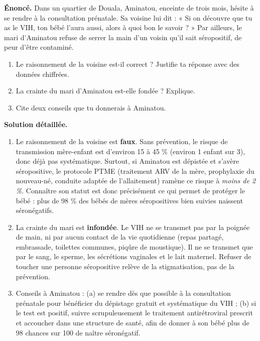 \documentclass[11pt]{article}
\begin{document}
\begin{exoresolu}
\textbf{Énoncé.} Dans un quartier de Douala, Aminatou, enceinte de trois mois, hésite à se rendre à la consultation prénatale. Sa voisine lui dit : « Si on découvre que tu as le VIH, ton bébé l'aura aussi, alors à quoi bon le savoir ? » Par ailleurs, le mari d'Aminatou refuse de serrer la main d'un voisin qu'il sait séropositif, de peur d'être contaminé.
\begin{enumerate}
\item Le raisonnement de la voisine est-il correct ? Justifie ta réponse avec des données chiffrées.
\item La crainte du mari d'Aminatou est-elle fondée ? Explique.
\item Cite deux conseils que tu donnerais à Aminatou.
\end{enumerate}
\tcblower
\textbf{Solution détaillée.}
\begin{enumerate}
\item Le raisonnement de la voisine est \textbf{faux}. Sans prévention, le risque de transmission mère-enfant est d'environ 15 à 45 \% (environ 1 enfant sur 3), donc déjà pas systématique. Surtout, si Aminatou est dépistée et s'avère séropositive, le protocole PTME (traitement ARV de la mère, prophylaxie du nouveau-né, conduite adaptée de l'allaitement) ramène ce risque à \emph{moins de 2 \%}. Connaître son statut est donc précisément ce qui permet de protéger le bébé : plus de 98 \% des bébés de mères séropositives bien suivies naissent séronégatifs.
\item La crainte du mari est \textbf{infondée}. Le VIH ne se transmet pas par la poignée de main, ni par aucun contact de la vie quotidienne (repas partagé, embrassade, toilettes communes, piqûre de moustique). Il ne se transmet que par le sang, le sperme, les sécrétions vaginales et le lait maternel. Refuser de toucher une personne séropositive relève de la stigmatisation, pas de la prévention.
\item Conseils à Aminatou : (a) se rendre dès que possible à la consultation prénatale pour bénéficier du dépistage gratuit et systématique du VIH ; (b) si le test est positif, suivre scrupuleusement le traitement antirétroviral prescrit et accoucher dans une structure de santé, afin de donner à son bébé plus de 98 chances sur 100 de naître séronégatif.
\end{enumerate}
\end{exoresolu}
\end{document}
